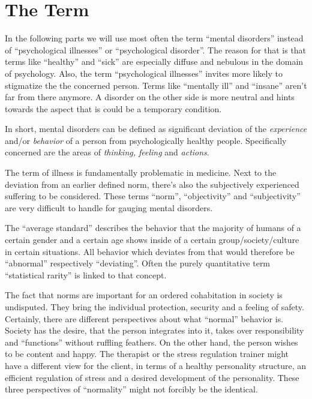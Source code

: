 \documentclass[../main.tex]{subfiles}
\begin{document}
\section{The Term}

In the following parts we will use most often the term ``mental disorders'' instead of ``psychological illnesses'' or ``psychological disorder''.
The reason for that is that terms like ``healthy'' and ``sick'' are especially diffuse and nebulous in the domain of psychology.
Also, the term ``psychological illnesses'' invites more likely to stigmatize the the concerned person.
Terms like ``mentally ill'' and ``insane'' aren't far from there anymore.
A disorder on the other side is more neutral and hints towards the aspect that is could be a temporary condition.

In short, mental disorders can be defined as significant deviation of the \emph{experience} and/or \emph{behavior}
of a person from psychologically healthy people.
Specifically concerned are the areas of \emph{thinking, feeling} and \emph{actions}.

The term of illness is fundamentally problematic in medicine.
Next to the deviation from an earlier defined norm, there's also the subjectively experienced suffering to be considered.
These terms ``norm'', ``objectivity'' and
``subjectivity'' are very difficult to handle for gauging mental disorders.

The ``average standard'' describes the behavior that the majority of humans of a certain gender and a certain age shows
inside of a certain group/society/culture in certain situations.
All behavior which deviates from that would therefore be ``abnormal'' respectively ``deviating''.
Often the purely quantitative term ``statistical rarity'' is linked to that concept.

The fact that norms are important for an ordered cohabitation in society is undisputed.
They bring the individual protection, security and a feeling of safety.
Certainly, there are different perspectives about what ``normal'' behavior is.
Society  has the desire, that the person integrates into it,
takes over responsibility and ``functions'' without ruffling feathers.
On the other hand, the person wishes to be content and happy.
The therapist or the stress regulation trainer might have a different view for the client,
in terms of a healthy personality structure, an efficient regulation of stress and a
desired development of the personality.
These three perspectives of ``normality'' might not forcibly be the identical.
\end{document}
